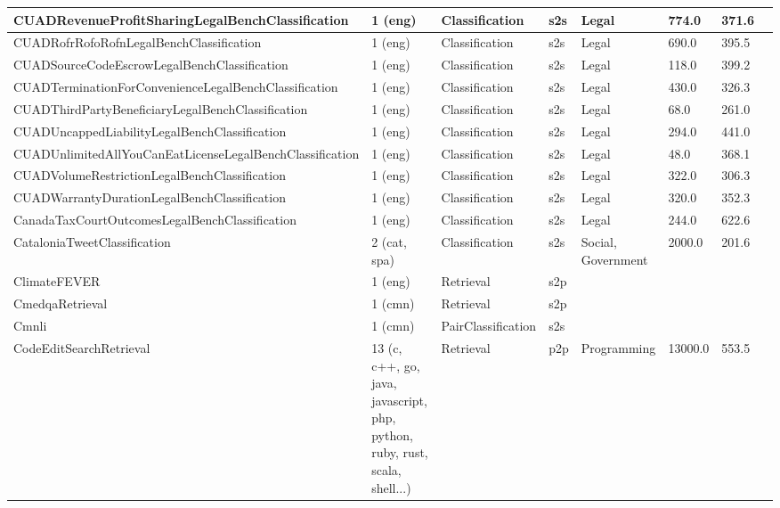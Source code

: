 \begin{longtable}{L{5.0cm}|L{1.5cm}L{1.4cm}L{1.4cm}L{1.4cm}L{1.4cm}L{1.0cm}L{1.0cm}}
 \hline 
CUADRevenueProfitSharingLegalBenchClassification \cite{guha2023legalbench} & 1 (eng) & Classification & s2s & Legal & 774.0 & 371.6 \\
 \hline 
CUADRofrRofoRofnLegalBenchClassification \cite{guha2023legalbench} & 1 (eng) & Classification & s2s & Legal & 690.0 & 395.5 \\
 \hline 
CUADSourceCodeEscrowLegalBenchClassification \cite{guha2023legalbench} & 1 (eng) & Classification & s2s & Legal & 118.0 & 399.2 \\
 \hline 
CUADTerminationForConvenienceLegalBenchClassification \cite{guha2023legalbench} & 1 (eng) & Classification & s2s & Legal & 430.0 & 326.3 \\
 \hline 
CUADThirdPartyBeneficiaryLegalBenchClassification \cite{guha2023legalbench} & 1 (eng) & Classification & s2s & Legal & 68.0 & 261.0 \\
 \hline 
CUADUncappedLiabilityLegalBenchClassification \cite{guha2023legalbench} & 1 (eng) & Classification & s2s & Legal & 294.0 & 441.0 \\
 \hline 
CUADUnlimitedAllYouCanEatLicenseLegalBenchClassification \cite{guha2023legalbench} & 1 (eng) & Classification & s2s & Legal & 48.0 & 368.1 \\
 \hline 
CUADVolumeRestrictionLegalBenchClassification \cite{guha2023legalbench} & 1 (eng) & Classification & s2s & Legal & 322.0 & 306.3 \\
 \hline 
CUADWarrantyDurationLegalBenchClassification \cite{guha2023legalbench} & 1 (eng) & Classification & s2s & Legal & 320.0 & 352.3 \\
 \hline 
CanadaTaxCourtOutcomesLegalBenchClassification \cite{guha2023legalbench} & 1 (eng) & Classification & s2s & Legal & 244.0 & 622.6 \\
 \hline 
CataloniaTweetClassification \cite{zotova-etal-2020-multilingual} & 2 (cat, spa) & Classification & s2s & Social, Government & 2000.0 & 201.6 \\
 \hline 
ClimateFEVER \cite{diggelmann2021climatefever} & 1 (eng) & Retrieval & s2p &  &  &  \\
 \hline 
CmedqaRetrieval  & 1 (cmn) & Retrieval & s2p &  &  &  \\
 \hline 
Cmnli \cite{xu-etal-2020-clue} & 1 (cmn) & PairClassification & s2s &  &  &  \\
 \hline 
CodeEditSearchRetrieval \cite{muennighoff2023octopack} & 13 (c, c++, go, java, javascript, php, python, ruby, rust, scala, shell...) & Retrieval & p2p & Programming & 13000.0 & 553.5 \\

\end{longtable}
